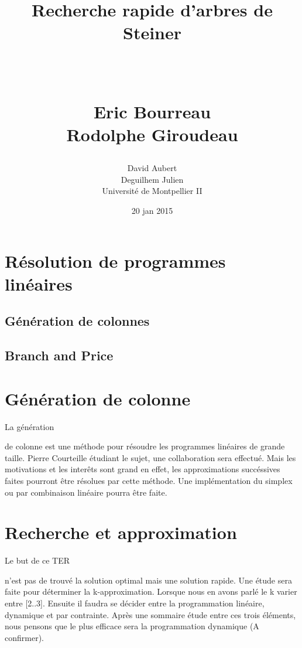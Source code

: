 \documentclass[paper=a4, fontsize=11pt]{scrartcl}	%
\title{ \vspace{-1in} 	\usefont{OT1}{bch}{b}{n}
		\huge \strut Recherche rapide d'arbres de Steiner \strut \\
		\Large \bfseries \strut Eric Bourreau \\ Rodolphe Giroudeau \strut
}
\author{ 									
	\usefont{OT1}{bch}{m}{n} David Aubert\\		
	\usefont{OT1}{bch}{m}{n} Deguilhem Julien\\		
	\usefont{OT1}{bch}{m}{n}Université de  Montpellier II\\	
}
\date{20 jan 2015}
\numberwithin{equation}{section}															%
\numberwithin{figure}{section}																%
\numberwithin{table}{section}																%
\begin{document}
\maketitle

\section{Résolution de programmes linéaires}

\subsection{Génération de colonnes}


\subsection{Branch and Price}







\iffalse
\section{Génération de colonne}
\begin{hspace}{1cm}
La génération
\end{hspace}
de colonne est une méthode pour résoudre les programmes linéaires de grande taille. Pierre Courteille étudiant le sujet, une collaboration sera effectué. Mais les motivations et les interêts sont grand en effet, les approximations succéssives faites pourront être résolues par cette méthode. Une implémentation du simplex ou par combinaison linéaire pourra être faite.


\section{Recherche et approximation}
\begin{hspace}{1cm}
	Le but de ce TER
\end{hspace}
n'est pas de trouvé la solution optimal mais une solution rapide. Une étude sera faite pour déterminer la k-approximation. Lorsque  nous en avons parlé le k varier entre [2..3].
\newline
Ensuite il faudra se décider entre la programmation linéaire, dynamique et par contrainte. Après une sommaire étude entre ces trois éléments, nous pensons que le plus efficace sera la programmation dynamique (A confirmer).
\end{document}
